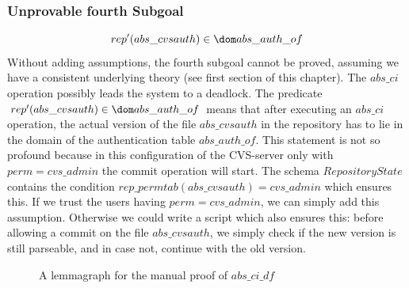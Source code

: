 \subsubsection{Unprovable fourth Subgoal}
%
%
\[rep'(abs\_cvsauth) \in \dom abs\_auth\_of\]\label{proof:sg4}
%
%
%
Without adding assumptions, the fourth subgoal cannot be proved, assuming we
have a consistent underlying theory (see first section of this chapter). The
$abs\_ci$ operation possibly leads the system to a deadlock.  The predicate
$rep'(abs\_cvsauth) \in \dom abs\_auth\_of$ means that after executing an
$abs\_ci$ operation, the actual version of the file $abs\_cvsauth$ in the
repository has to lie in the domain of the authentication table $abs\_auth\_of$.
This statement is not so profound because in this configuration of the CVS-server
only with $perm = cvs\_admin$ the commit operation will start. The schema
$RepositoryState$ contains the condition $rep\_permtab(abs\_cvsauth) =
cvs\_admin$ which ensures this. If we trust the users having $perm =
cvs\_admin$, we can simply add this assumption. Otherwise we could write a
script which also ensures this: before allowing a commit on the file
$abs\_cvsauth$, we simply check if the new version is still parseable, and in
case not, continue with the old version.
%
\begin{figure}%
\caption{A lemmagraph for the manual proof of $abs\_ci\_df$}%
\end{figure}%
%
%
%
